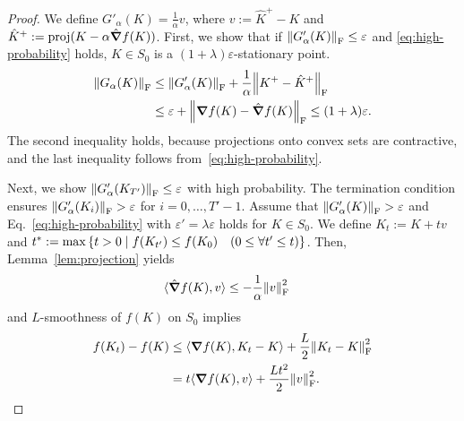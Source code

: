 \begin{proof}
  We define $G'_\alpha(K) = \frac{1}{\alpha}{v}$, where $v:=\hat{K}^+-K$ and $\hat{K}^+ := \operatorname{proj}(K-\alpha\hat \grad f(K))$.
  First, we show that if $\norm{G'_\alpha(K)}_\mathrm{F} \leq \varepsilon$ and \eqref{eq:high-probability} holds,
  $K \in S_0$ is a $(1+\lambda)\varepsilon$-stationary point.
  \begin{align}
    \norm{G_\alpha(K)}_\mathrm{F} & \leq \norm{G'_\alpha(K)}_\mathrm{F}+\frac{1}{\alpha}\norm{K^+-\hat{K}^+}_\mathrm{F} \\
                & \leq \varepsilon+\norm{\grad f(K)-\hat\grad f(K)}_\mathrm{F}                \leq (1+\lambda)\varepsilon.
  \end{align}
  The second inequality holds, because projections onto convex sets are contractive,
  and the last inequality follows from~\eqref{eq:high-probability}.

  Next, we show $\norm{G'_\alpha(K_{T'})}_\mathrm{F} \leq \varepsilon$ with high probability.
  The termination condition ensures $\norm{G'_\alpha(K_i)}_\mathrm{F} > \varepsilon$ for $i = 0, \dots, T'-1$.
  Assume that $\norm{G'_\alpha(K)}_\mathrm{F} > \varepsilon$ and Eq.~\eqref{eq:high-probability} with $\varepsilon' = \lambda \varepsilon$ holds for $K\in S_0$.
    We define $K_t:=K+tv$ and $t^* := \max\qty{t > 0 \mid f(K_{t'}) \leq f(K_0)\quad (0\leq \forall t' \leq t)}$.
  Then, Lemma~\ref{lem:projection} yields
  \begin{align}
    \q<\hat \grad f(K), v> & \leq -\frac{1}{\alpha}\normF{v}^2\label{eq:mf-proj}
  \end{align}
  and $L$-smoothness of $f(K)$ on $S_0$ implies
  \begin{align}
    f(K_t)-f(K) & \leq \q<\grad f(K), K_t-K>+\frac{L}{2}\normF{K_t-K}^2\\
    &=t\q<\grad f(K), v>+\frac{Lt^2}{2}\normF{v}^2.\label{eq:mf-L-smooth}
  \end{align}
  

\end{proof}
